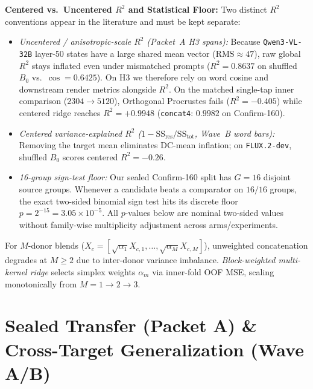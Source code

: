\documentclass[10pt,twocolumn]{article}
\begin{document}
\textbf{Centered vs.\ Uncentered $R^2$ and Statistical Floor:} Two distinct $R^2$ conventions appear in the literature and must be kept separate:
\begin{itemize}[leftmargin=1.2em,itemsep=1.5pt]
\item \emph{Uncentered / anisotropic-scale $R^2$ (Packet~A H3 spans):} Because \texttt{Qwen3-VL-32B} layer-50 states have a large shared mean vector ($\text{RMS}\approx 47$), raw global $R^2$ stays inflated even under mismatched prompts ($R^2=0.8637$ on shuffled $B_0$ vs.\ $\cos=0.6425$). On H3 we therefore rely on word cosine and downstream render metrics alongside $R^2$. On the matched single-tap inner comparison ($2304 \to 5120$), Orthogonal Procrustes fails ($R^2 = -0.405$) while centered ridge reaches $R^2 = +0.9948$ (\texttt{concat4}: $0.9982$ on Confirm-160).
\item \emph{Centered variance-explained $R^2$ ($1 - \mathrm{SS}_{\mathrm{res}}/\mathrm{SS}_{\mathrm{tot}}$, Wave~B word bars):} Removing the target mean eliminates DC-mean inflation; on \texttt{FLUX.2-dev}, shuffled $B_0$ scores centered $R^2 = -0.26$.
\item \emph{16-group sign-test floor:} Our sealed Confirm-160 split has $G=16$ disjoint source groups. Whenever a candidate beats a comparator on $16/16$ groups, the exact two-sided binomial sign test hits its discrete floor $p = 2^{-15} = 3.05\times 10^{-5}$. All $p$-values below are nominal two-sided values without family-wise multiplicity adjustment across arms/experiments.
\end{itemize}

For $M$-donor blends ($X_c = [\sqrt{\alpha_1} X_{c,1}, \dots, \sqrt{\alpha_M} X_{c,M}]$), unweighted concatenation degrades at $M \ge 2$ due to inter-donor variance imbalance. \emph{Block-weighted multi-kernel ridge} selects simplex weights $\alpha_m$ via inner-fold OOF MSE, scaling monotonically from $M=1 \to 2 \to 3$.

\section{Sealed Transfer (Packet A) \& Cross-Target Generalization (Wave A/B)}
\end{document}
